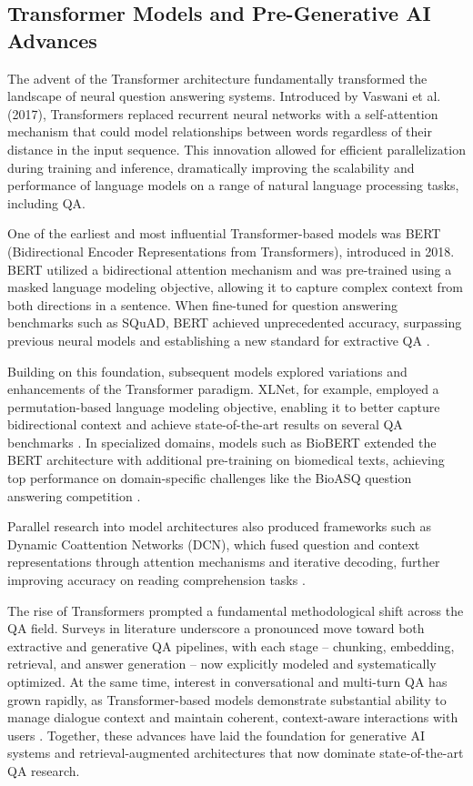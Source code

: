 \begin{spacing}{1.5}
\section{Transformer Models and Pre-Generative AI Advances}
The advent of the Transformer architecture fundamentally transformed the landscape of neural question answering systems. Introduced by Vaswani et al. (2017), Transformers replaced recurrent neural networks with a self-attention mechanism that could model relationships between words regardless of their distance in the input sequence. This innovation allowed for efficient parallelization during training and inference, dramatically improving the scalability and performance of language models on a range of natural language processing tasks, including QA.

One of the earliest and most influential Transformer-based models was BERT (Bidirectional Encoder Representations from Transformers), introduced in 2018. BERT utilized a bidirectional attention mechanism and was pre-trained using a masked language modeling objective, allowing it to capture complex context from both directions in a sentence. When fine-tuned for question answering benchmarks such as SQuAD, BERT achieved unprecedented accuracy, surpassing previous neural models and establishing a new standard for extractive QA \citep{devlin_bert_2019}.

Building on this foundation, subsequent models explored variations and enhancements of the Transformer paradigm. XLNet, for example, employed a permutation-based language modeling objective, enabling it to better capture bidirectional context and achieve state-of-the-art results on several QA benchmarks \citep{yang_xlnet_2020}. In specialized domains, models such as BioBERT extended the BERT architecture with additional pre-training on biomedical texts, achieving top performance on domain-specific challenges like the BioASQ question answering competition \citep{yoon_pre-trained_2019}.

Parallel research into model architectures also produced frameworks such as Dynamic Coattention Networks (DCN), which fused question and context representations through attention mechanisms and iterative decoding, further improving accuracy on reading comprehension tasks \citep{xiong_dynamic_2018}.

The rise of Transformers prompted a fundamental methodological shift across the QA field. Surveys in literature underscore a pronounced move toward both extractive and generative QA pipelines, with each stage -- chunking, embedding, retrieval, and answer generation -- now explicitly modeled and systematically optimized. At the same time, interest in conversational and multi-turn QA has grown rapidly, as Transformer-based models demonstrate substantial ability to manage dialogue context and maintain coherent, context-aware interactions with users \citep{yue_survey_2025,antoniou_survey_2022}. Together, these advances have laid the foundation for generative AI systems and retrieval-augmented architectures that now dominate state-of-the-art QA research.


\end{spacing}
